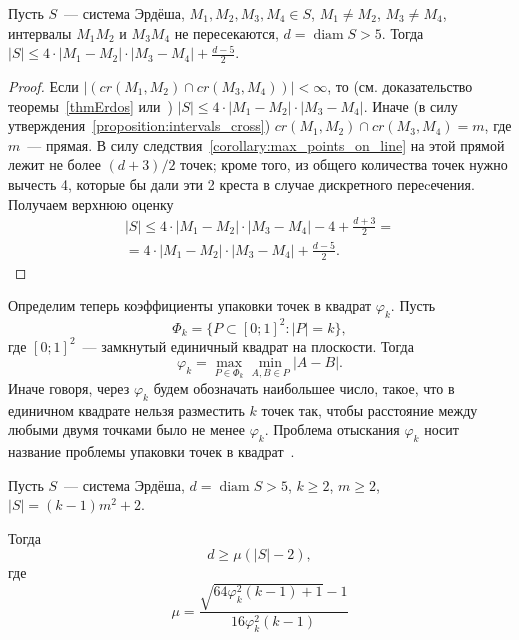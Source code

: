 \begin{lemma}
	\label{lemma_preliminary_size}
	Пусть $S$~--- система Эрдёша,
	$M_1, M_2, M_3, M_4 \in S$,
	$M_1 \neq M_2$, $M_3 \neq M_4$,
	интервалы $M_1 M_2$ и $M_3 M_4$ не пересекаются,
	$d = \operatorname{diam} S > 5$.
	Тогда $|S| \leq 4 \cdot |M_1 - M_2| \cdot |M_3 - M_4| + \frac{d-5}{2}$.
\end{lemma}

\begin{proof}
	Если $|(cr(M_1, M_2) \cap cr(M_3, M_4))| < \infty$,
	то (см. доказательство теоремы~\ref{thmErdos} или~\cite[часть 2, неравенство (1)]{solymosi2003note})
	$|S| \leq 4 \cdot |M_1 - M_2| \cdot |M_3 - M_4|$.
	Иначе (в силу утверждения~\ref{proposition:intervals_cross}) $cr(M_1, M_2) \cap cr(M_3, M_4) = m$,
	где $m$~--- прямая.
	В силу следствия~\ref{corollary:max_points_on_line} на этой прямой лежит не более $(d+3)/2$ точек;
	кроме того, из общего количества точек нужно вычесть 4,
	которые бы дали эти 2 креста в случае дискретного переcечения.
	Получаем верхнюю оценку
	\begin{multline}
		|S| \leq 4 \cdot |M_1 - M_2| \cdot |M_3 - M_4| - 4 + \frac{d+3}{2}
		=
		\\=
		4 \cdot |M_1 - M_2| \cdot |M_3 - M_4| + \frac{d-5}{2}
		.
	\end{multline}
\end{proof}

Определим теперь коэффициенты упаковки точек в квадрат $\varphi_k$.
Пусть
\begin{equation*}
	\Phi_k = \{ P \subset [0;1]^2 : |P|=k\}
	,
\end{equation*}
где $[0;1]^2$~--- замкнутый единичный квадрат на плоскости.
Тогда
\begin{equation*}
	\varphi_k = \max_{P \in \Phi_k} \min_{A,B \in P} |A - B|
	.
\end{equation*}
Иначе говоря, через $\varphi_k$ будем обозначать наибольшее число, такое,
что в единичном квадрате нельзя разместить $k$ точек так,
чтобы расстояние между любыми двумя точками было не менее $\varphi_k$.
Проблема отыскания $\varphi_k$ носит название проблемы упаковки точек в квадрат~\cite{locatelli2002packing,costa2013valid}.


\begin{lemma}
	Пусть $S$~--- система Эрдёша,
	$d = \operatorname{diam} S > 5$,
	$k \geq 2$,
	$m \geq 2$,
	$ |S| = (k-1)m^2 + 2$.

	Тогда
	\begin{equation}
		d \geq \mu (|S| - 2),
	\end{equation}
	где
	\begin{equation}
		\mu = \frac{\sqrt{64\varphi_k^2 (k-1)+1}-1}{16\varphi_k^2 (k-1)}
	\end{equation}
\end{lemma}

